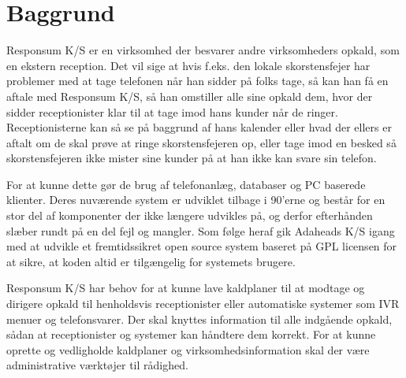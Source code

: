 \chapter{Baggrund}

Responsum K/S er en virksomhed der besvarer andre virksomheders opkald, som en ekstern reception. Det vil sige at hvis f.eks. den lokale skorstensfejer har problemer med at tage telefonen når han sidder på folks tage, så kan han få en aftale med Responsum K/S, så han omstiller alle sine opkald dem, hvor der sidder receptionister klar til at tage imod hans kunder når de ringer. Receptionisterne kan så se på baggrund af hans kalender eller hvad der ellers er aftalt om de skal prøve at ringe skorstensfejeren op, eller tage imod en besked så skorstensfejeren ikke mister sine kunder på at han ikke kan svare sin telefon.

For at kunne dette gør de brug af telefonanlæg, databaser og PC baserede klienter. Deres nuværende system er udviklet tilbage i 90'erne og består for en stor del af komponenter der ikke længere udvikles på, og derfor efterhånden slæber rundt på en del fejl og mangler. Som følge heraf gik Adaheads K/S igang med at udvikle et fremtidssikret open source system baseret på GPL licensen for at sikre, at koden altid er tilgængelig for systemets brugere.

Responsum K/S har behov for at kunne lave kaldplaner til at modtage og dirigere opkald til henholdsvis receptionister eller automatiske systemer som IVR menuer og telefonsvarer. Der skal knyttes information til alle indgående opkald, sådan at receptionister og systemer kan håndtere dem korrekt. For at kunne oprette og vedligholde kaldplaner og virksomhedsinformation skal der være administrative værktøjer til rådighed.


